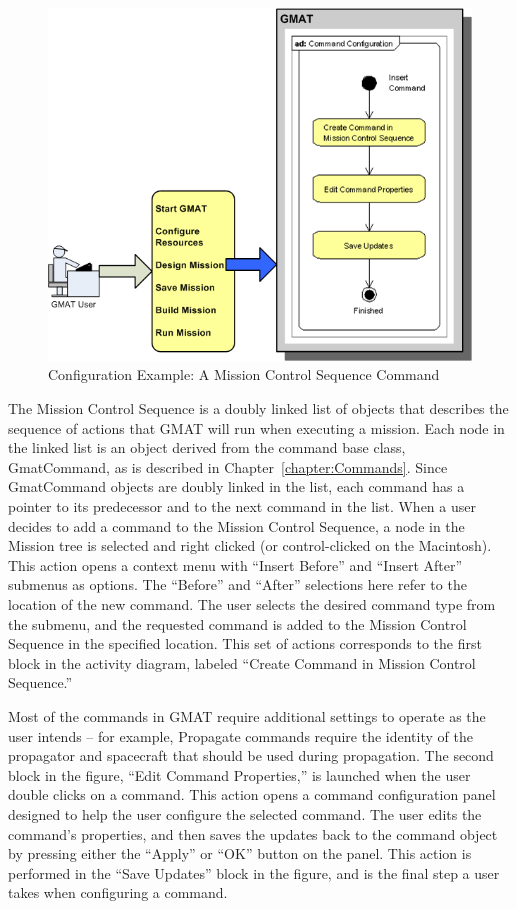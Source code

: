 \begin{figure}[H]
\begin{center}
\includegraphics[301,251]{Images/GMAT_ConfigureCommand.png}
\caption{\label{figure:CommandConfig}Configuration Example: A Mission Control Sequence Command}
\end{center}
\end{figure}

The Mission Control Sequence is a doubly linked list of objects that describes the sequence of
actions that GMAT will run when executing a mission.  Each node in the linked list is an object
derived from the command base class, GmatCommand, as is described in Chapter~\ref{chapter:Commands}.
 Since GmatCommand objects are doubly linked in the list, each command has a pointer to its
predecessor and to the next command in the list.  When a user decides to add a command to the
Mission Control Sequence, a node in the Mission tree is selected and right clicked (or
control-clicked on the Macintosh).  This action opens a context menu with ``Insert Before'' and
``Insert After'' submenus as options.  The ``Before'' and ``After'' selections here refer to the
location of the new command.  The user selects the desired command type from the submenu, and the
requested command is added to the Mission Control Sequence in the specified location.  This set of
actions corresponds to the first block in the activity diagram, labeled ``Create Command in Mission
Control Sequence.''

Most of the commands in GMAT require additional settings to operate as the user intends -- for
example, Propagate commands require the identity of the propagator and spacecraft that should be
used during propagation.  The second block in the figure, ``Edit Command Properties,'' is launched
when the user double clicks on a command.  This action opens a command configuration panel designed
to help the user configure the selected command.  The user edits the command's properties, and then
saves the updates back to the command object by pressing either the ``Apply'' or ``OK'' button on
the panel.  This action is performed in the ``Save Updates'' block in the figure, and is the final
step a user takes when configuring a command.

